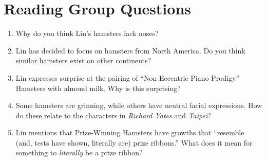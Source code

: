 \documentclass[10pt,twoside,openright]{memoir}
\begin{document}
\chapter*{Reading Group Questions}
\begin{enumerate}
  \item Why do you think Lin's hamsters lack noses?
  \item Lin has decided to focus on hamsters from North America. Do you think 
  similar hamsters exist on other continents?
  \item Lin expresses surprise at the pairing of ``Non-Eccentric Piano Prodigy'' 
  Hamsters with almond milk. Why is this surprising?
  \item Some hamsters are grinning, while others have neutral facial
  expressions. How do these relate to the characters in {\em Richard Yates} and
  {\em Taipei}?
  \item Lin mentions that Prize-Winning Hamsters have growths that ``resemble
  (and, tests have shown, literally are) prize ribbons.'' What does it mean for
  something to {\em literally} be a prize ribbon?
\end{enumerate}
\end{document}
